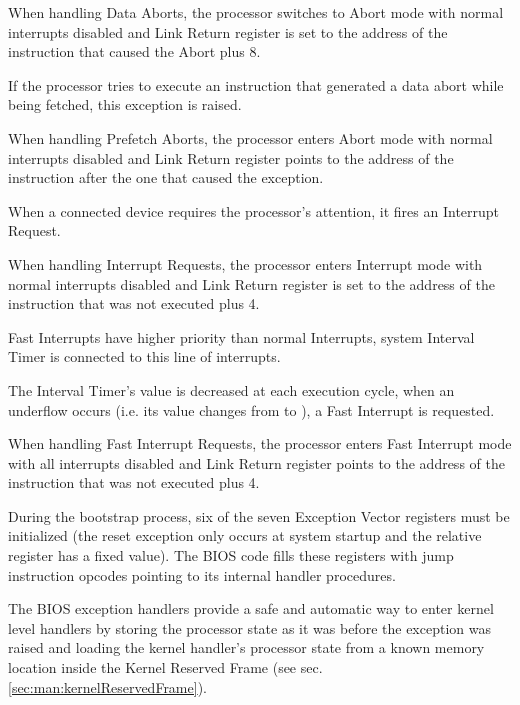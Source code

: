 When handling Data Aborts, the processor switches to Abort mode with normal interrupts disabled and Link Return register is set to the address of the instruction that caused the Abort plus 8.


If the processor tries to execute an instruction that generated a data abort while being fetched, this exception is raised.

When handling Prefetch Aborts, the processor enters Abort mode with normal interrupts disabled and Link Return register points to the address of the instruction after the one that caused the exception.

When a connected device requires the processor's attention, it fires an Interrupt Request.

When handling Interrupt Requests, the processor enters Interrupt mode with normal interrupts disabled and Link Return register is set to the address of the instruction that was not executed plus 4.

Fast Interrupts have higher priority than normal Interrupts, system Interval Timer is connected to this line of interrupts. 

The Interval Timer's value is decreased at each execution cycle, when an underflow occurs (i.e. its value changes from  to ), a Fast Interrupt is requested.

When handling Fast Interrupt Requests, the processor enters Fast Interrupt mode with all interrupts disabled and Link Return register points to the address of the instruction that was not executed plus 4.

\label{sec:man:romExceptionHandlers}

During the bootstrap process, six of the seven Exception Vector registers must be initialized (the reset exception only occurs at system startup and the relative register has a fixed value).
The BIOS code fills these registers with jump instruction opcodes pointing to its internal handler procedures.

The BIOS exception handlers provide a safe and automatic way to enter kernel level handlers by storing the processor state as it was before the exception was raised and loading the kernel handler's processor state from a known memory location inside the Kernel Reserved Frame (see sec. \ref{sec:man:kernelReservedFrame}).

